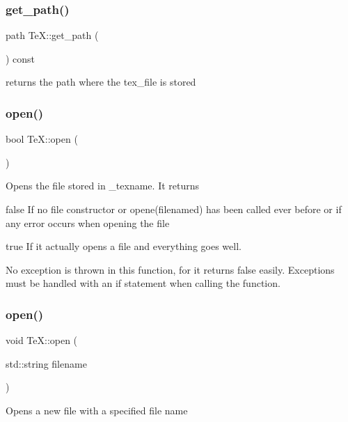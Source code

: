 \subsubsection{\texorpdfstring{get\+\_\+path()}{get\_path()}}
{\footnotesize\ttfamily path Te\+X\+::get\+\_\+path (\begin{DoxyParamCaption}{ }\end{DoxyParamCaption}) const}

returns the path where the tex\+\_\+file is stored \mbox{\label{class_te_x_a742040deabcc5e71e314a3e3cf7deaa6}} 
\subsubsection{\texorpdfstring{open()}{open()}\hspace{0.1cm}{\footnotesize\ttfamily [1/2]}}
{\footnotesize\ttfamily bool Te\+X\+::open (\begin{DoxyParamCaption}{ }\end{DoxyParamCaption})}

Opens the file stored in \+\_\+texname. It returns
\begin{DoxyItemize}
\item false If no file constructor or opene(filenamed) has been called ever before or if any error occurs when opening the file
\item true If it actually opens a file and everything goes well.
\end{DoxyItemize}

No exception is thrown in this function, for it returns false easily. Exceptions must be handled with an if statement when calling the function. \mbox{\label{class_te_x_ac3807f2a31df4bc40cf679e4f60b87c7}} 
\subsubsection{\texorpdfstring{open()}{open()}\hspace{0.1cm}{\footnotesize\ttfamily [2/2]}}
{\footnotesize\ttfamily void Te\+X\+::open (\begin{DoxyParamCaption}\item[{std\+::string}]{filename }\end{DoxyParamCaption})}

Opens a new file with a specified file name


